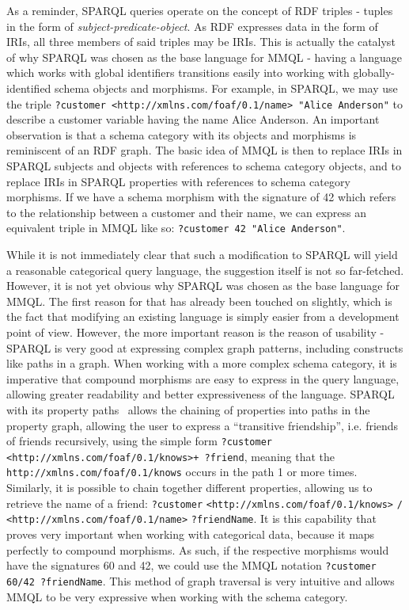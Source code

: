 As a reminder, SPARQL queries operate on the concept of RDF triples - tuples in the form of \textit{subject-predicate-object}. As RDF expresses data in the form of IRIs, all three members of said triples may be IRIs.
This is actually the catalyst of why SPARQL was chosen as the base language for MMQL - having a language which works with global identifiers transitions easily into working with globally-identified schema objects and morphisms.
For example, in SPARQL, we may use the triple \texttt{?customer <http://xmlns.com/foaf/0.1/name> "Alice Anderson"} to describe a customer variable having the name Alice Anderson.
An important observation is that a schema category with its objects and morphisms is reminiscent of an RDF graph.
The basic idea of MMQL is then to replace IRIs in SPARQL subjects and objects with references to schema category objects, and to replace IRIs in SPARQL properties with references to schema category morphisms.
If we have a schema morphism with the signature of 42 which refers to the relationship between a customer and their name, we can express an equivalent triple in MMQL like so: \texttt{?customer 42 "Alice Anderson"}.

While it is not immediately clear that such a modification to SPARQL will yield a reasonable categorical query language, the suggestion itself is not so far-fetched.
However, it is not yet obvious why SPARQL was chosen as the base language for MMQL.
The first reason for that has already been touched on slightly, which is the fact that modifying an existing language is simply easier from a development point of view.
However, the more important reason is the reason of usability - SPARQL is very good at expressing complex graph patterns, including constructs like paths in a graph.
When working with a more complex schema category, it is imperative that compound morphisms are easy to express in the query language, allowing greater readability and better expressiveness of the language.
SPARQL with its property paths~\cite{sparql_propertypaths} allows the chaining of properties into paths in the property graph, allowing the user to express a ``transitive friendship'', i.e. friends of friends recursively, using the simple form \texttt{?customer <http://xmlns.com/foaf/0.1/knows>+ ?friend}, meaning that the \texttt{http://xmlns.com/foaf/0.1/knows} occurs in the path 1 or more times.
Similarly, it is possible to chain together different properties, allowing us to retrieve the name of a friend: \texttt{?customer} \texttt{<http://xmlns.com/foaf/0.1/knows>} \texttt{/ <http://xmlns.com/foaf/0.1/name>} \texttt{?friendName}.
It is this capability that proves very important when working with categorical data, because it maps perfectly to compound morphisms.
As such, if the respective morphisms would have the signatures 60 and 42, we could use the MMQL notation \texttt{?customer 60/42 ?friendName}.
This method of graph traversal is very intuitive and allows MMQL to be very expressive when working with the schema category.

